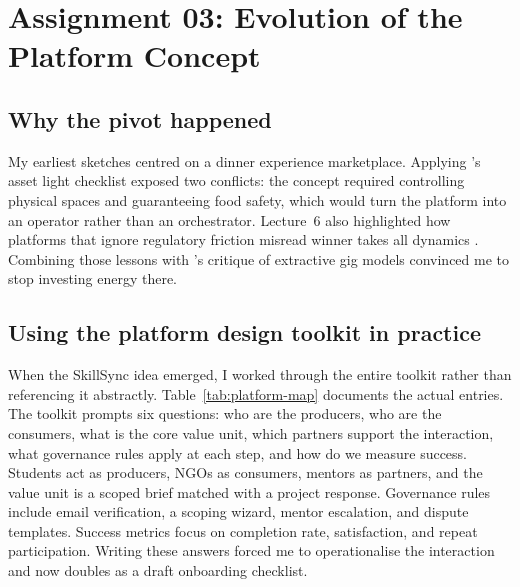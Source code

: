 \section*{Assignment 03: Evolution of the Platform Concept}

\subsection*{Why the pivot happened}
My earliest sketches centred on a dinner experience marketplace. Applying \citet{Choudary2016}'s asset light checklist exposed two conflicts: the concept required controlling physical spaces and guaranteeing food safety, which would turn the platform into an operator rather than an orchestrator. Lecture~6 also highlighted how platforms that ignore regulatory friction misread winner takes all dynamics \citep{Lecture06}. Combining those lessons with \citet{Srnicek2017}'s critique of extractive gig models convinced me to stop investing energy there.

\subsection*{Using the platform design toolkit in practice}
When the SkillSync idea emerged, I worked through the entire \citet{Reillier2017} toolkit rather than referencing it abstractly. Table~\ref{tab:platform-map} documents the actual entries. The toolkit prompts six questions: who are the producers, who are the consumers, what is the core value unit, which partners support the interaction, what governance rules apply at each step, and how do we measure success. Students act as producers, NGOs as consumers, mentors as partners, and the value unit is a scoped brief matched with a project response. Governance rules include email verification, a scoping wizard, mentor escalation, and dispute templates. Success metrics focus on completion rate, satisfaction, and repeat participation. Writing these answers forced me to operationalise the interaction and now doubles as a draft onboarding checklist.

